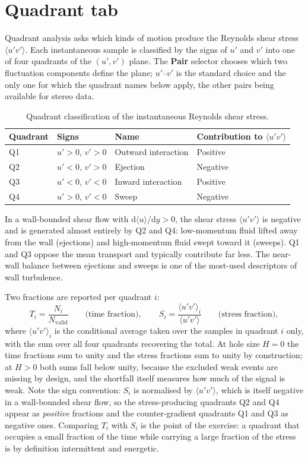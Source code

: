 \documentclass[11pt, a4paper]{report}
\newcommand{\uipth}[1]{\textbf{\textcolor{upblue}{#1}}}
\begin{document}
\section{Quadrant tab}

Quadrant analysis asks which kinds of motion produce the Reynolds shear stress $\langle u'v' \rangle$. Each instantaneous sample is classified by the signs of $u'$ and $v'$ into one of four quadrants of the $(u', v')$ plane. The \uipth{Pair} selector chooses which two fluctuation components define the plane; $u'$--$v'$ is the standard choice and the only one for which the quadrant names below apply, the other pairs being available for stereo data.

\begin{table}[htbp]
\centering
\caption{Quadrant classification of the instantaneous Reynolds shear stress.}
\begin{tabular}{llll}
\toprule
\textbf{Quadrant} & \textbf{Signs} & \textbf{Name} & \textbf{Contribution to $\langle u'v' \rangle$} \\
\midrule
Q1 & $u' > 0$, $v' > 0$ & Outward interaction & Positive \\
Q2 & $u' < 0$, $v' > 0$ & Ejection            & Negative \\
Q3 & $u' < 0$, $v' < 0$ & Inward interaction  & Positive \\
Q4 & $u' > 0$, $v' < 0$ & Sweep               & Negative \\
\bottomrule
\end{tabular}
\end{table}

In a wall-bounded shear flow with $\mathrm{d}\langle u \rangle/\mathrm{d}y > 0$, the shear stress $\langle u'v' \rangle$ is negative and is generated almost entirely by Q2 and Q4: low-momentum fluid lifted away from the wall (ejections) and high-momentum fluid swept toward it (sweeps). Q1 and Q3 oppose the mean transport and typically contribute far less. The near-wall balance between ejections and sweeps is one of the most-used descriptors of wall turbulence.

Two fractions are reported per quadrant $i$:
\[
T_i = \frac{N_i}{N_{\mathrm{valid}}}
\qquad\text{(time fraction)},
\qquad
S_i = \frac{\langle u'v' \rangle_i}{\langle u'v' \rangle}
\qquad\text{(stress fraction)},
\]
where $\langle u'v' \rangle_i$ is the conditional average taken over the samples in quadrant $i$ only, with the sum over all four quadrants recovering the total. At hole size $H = 0$ the time fractions sum to unity and the stress fractions sum to unity by construction; at $H > 0$ both sums fall below unity, because the excluded weak events are missing by design, and the shortfall itself measures how much of the signal is weak. Note the sign convention: $S_i$ is normalised by $\langle u'v' \rangle$, which is itself negative in a wall-bounded shear flow, so the stress-producing quadrants Q2 and Q4 appear as \emph{positive} fractions and the counter-gradient quadrants Q1 and Q3 as negative ones. Comparing $T_i$ with $S_i$ is the point of the exercise: a quadrant that occupies a small fraction of the time while carrying a large fraction of the stress is by definition intermittent and energetic.
\end{document}
